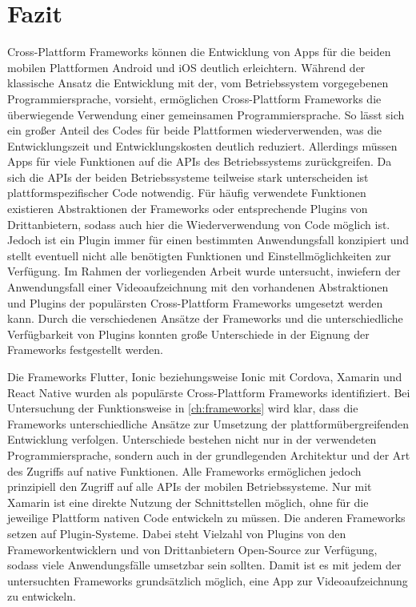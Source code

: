 \chapter{Fazit}
\label{ch:fazit}


Cross-Plattform Frameworks können die Entwicklung von Apps für die beiden mobilen Plattformen Android und iOS deutlich erleichtern.
Während der klassische Ansatz die Entwicklung mit der, vom Betriebssystem vorgegebenen Programmiersprache, vorsieht, ermöglichen Cross-Plattform Frameworks die überwiegende Verwendung einer gemeinsamen Programmiersprache.
So lässt sich ein großer Anteil des Codes für beide Plattformen wiederverwenden, was die Entwicklungszeit und Entwicklungskosten deutlich reduziert.
Allerdings müssen Apps für viele Funktionen auf die \acp{API} des Betriebssystems zurückgreifen.
Da sich die \acp{API} der beiden Betriebssysteme teilweise stark unterscheiden ist plattformspezifischer Code notwendig.
Für häufig verwendete Funktionen existieren Abstraktionen der Frameworks oder entsprechende Plugins von Drittanbietern, sodass auch hier die Wiederverwendung von Code möglich ist.
Jedoch ist ein Plugin immer für einen bestimmten Anwendungsfall konzipiert und stellt eventuell nicht alle benötigten Funktionen und Einstellmöglichkeiten zur Verfügung.
Im Rahmen der vorliegenden Arbeit wurde untersucht, inwiefern der Anwendungsfall einer Videoaufzeichnung mit den vorhandenen Abstraktionen und Plugins der populärsten Cross-Plattform Frameworks umgesetzt werden kann.
Durch die verschiedenen Ansätze der Frameworks und die unterschiedliche Verfügbarkeit von Plugins konnten große Unterschiede in der Eignung der Frameworks festgestellt werden.


Die Frameworks Flutter, Ionic beziehungsweise Ionic mit Cordova, Xamarin und React Native wurden als populärste Cross-Plattform Frameworks identifiziert.
Bei Untersuchung der Funktionsweise in \autoref{ch:frameworks} wird klar, dass die Frameworks unterschiedliche Ansätze zur Umsetzung der plattformübergreifenden Entwicklung verfolgen.
Unterschiede bestehen nicht nur in der verwendeten Programmiersprache, sondern auch in der grundlegenden Architektur und der Art des Zugriffs auf native Funktionen.
Alle Frameworks ermöglichen jedoch prinzipiell den Zugriff auf alle \acp{API} der mobilen Betriebssysteme.
Nur mit Xamarin ist eine direkte Nutzung der Schnittstellen möglich, ohne für die jeweilige Plattform nativen Code entwickeln zu müssen.
Die anderen Frameworks setzen auf Plugin-Systeme.
Dabei steht Vielzahl von Plugins von den Frameworkentwicklern und von Drittanbietern Open-Source zur Verfügung, sodass viele Anwendungsfälle umsetzbar sein sollten.
Damit ist es mit jedem der untersuchten Frameworks grundsätzlich möglich, eine App zur Videoaufzeichnung zu entwickeln.


